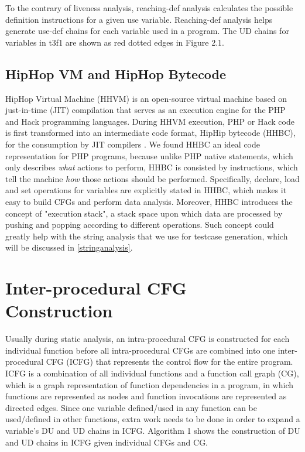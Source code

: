 To the contrary of liveness analysis, reaching-def analysis calculates the possible definition instructions for a given use variable. Reaching-def analysis helps generate use-def chains for each variable used in a program. The UD chains for variables in t3f1 are shown as red dotted edges in Figure 2.1.

\subsection{HipHop VM and HipHop Bytecode}
HipHop Virtual Machine (HHVM) is an open-source virtual machine based on just-in-time (JIT) compilation that serves as an execution engine for the PHP and Hack programming languages. During HHVM execution, PHP or Hack code is first transformed into an intermediate code format, HipHip bytecode (HHBC), for the consumption by JIT compilers \cite{ref5}. We found HHBC an ideal code representation for PHP programs, because unlike PHP native statements, which only describes \textit{what} actions to perform, HHBC is consisted by instructions, which tell the machine \textit{how} those actions should be performed. Specifically, declare, load and set operations for variables are explicitly stated in HHBC, which makes it easy to build CFGs and perform data analysis. Moreover, HHBC introduces the concept of "execution stack", a stack space upon which data are processed by pushing and popping according to different operations. Such concept could greatly help with the string analysis that we use for testcase generation, which will be discussed in \ref{stringanalysis}.

\section{Inter-procedural CFG Construction}
Usually during static analysis, an intra-procedural CFG is constructed for each individual function before all intra-procedural CFGs are combined into one inter-procedural CFG (ICFG) that represents the control flow for the entire program. ICFG is a combination of all individual functions and a function call graph (CG), which is a graph representation of function dependencies in a program, in which functions are represented as nodes and function invocations are represented as directed edges. Since one variable defined/used in any function can be used/defined in other functions, extra work needs to be done in order to expand a variable's DU and UD chains in ICFG. Algorithm 1 shows the construction of DU and UD chains in ICFG given individual CFGs and CG.

